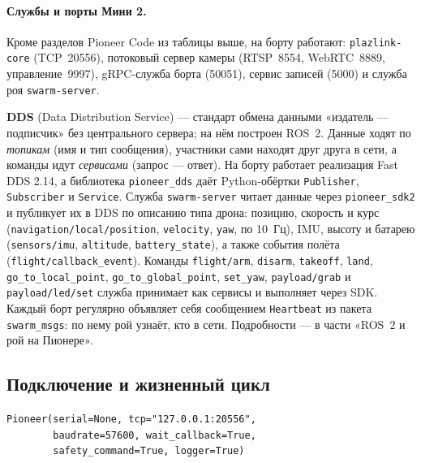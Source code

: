 \paragraph{Службы и порты Мини 2.} Кроме разделов Pioneer Code из таблицы выше, на борту работают: \texttt{plazlink-core} (TCP~20556), потоковый сервер камеры (RTSP~8554, WebRTC~8889, управление~9997), gRPC-служба борта (50051), сервис записей (5000) и служба роя \texttt{swarm-server}.
\begin{infobox}
\textbf{DDS} (Data Distribution Service) --- стандарт обмена данными «издатель --- подписчик» без центрального сервера; на нём построен ROS~2. Данные ходят по \emph{топикам} (имя и тип сообщения), участники сами находят друг друга в сети, а команды идут \emph{сервисами} (запрос --- ответ). На борту работает реализация Fast DDS 2.14, а библиотека \texttt{pioneer\_dds} даёт Python-обёртки \verb|Publisher|, \verb|Subscriber| и \verb|Service|. Служба \texttt{swarm-server} читает данные через \texttt{pioneer\_sdk2} и публикует их в DDS по описанию типа дрона: позицию, скорость и курс (\texttt{navigation/local/\allowbreak position}, \texttt{velocity}, \texttt{yaw}, по 10~Гц), IMU, высоту и батарею (\texttt{sensors/\allowbreak imu}, \texttt{altitude}, \texttt{battery\_state}), а также события полёта (\texttt{flight/\allowbreak callback\_event}). Команды \texttt{flight/arm}, \texttt{disarm}, \texttt{takeoff}, \texttt{land}, \texttt{go\_to\_local\_point}, \texttt{go\_to\_global\_point}, \texttt{set\_yaw}, \texttt{payload/grab} и \texttt{payload/led/set} служба принимает как сервисы и выполняет через SDK. Каждый борт регулярно объявляет себя сообщением \texttt{Heartbeat} из пакета \texttt{swarm\_msgs}: по нему рой узнаёт, кто в сети. Подробности --- в части «ROS~2 и рой на Пионере».
\end{infobox}

\subsection{Подключение и жизненный цикл}

\begin{codebox}[Конструктор]
\verb|Pioneer(serial=None, tcp="127.0.0.1:20556",|\\
\verb|        baudrate=57600, wait_callback=True,|\\
\verb|        safety_command=True, logger=True)|
\end{codebox}

